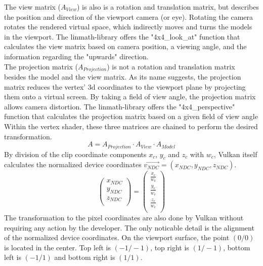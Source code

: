 The view matrix ($A_{View}$) is also is a rotation and translation matrix, but describes the position and direction of the viewport camera (or eye). Rotating the camera rotates the rendered virtual space, which indirectly moves and turns the models in the viewport. The linmath-library offers the "4x4\_look\_at" function that calculates the view matrix based on camera position, a viewing angle, and the information regarding the "upwards" direction.\\
The projection matrix ($A_{Projection}$)  is not a rotation and translation matrix besides the model and the view matrix. As its name suggests, the projection matrix reduces the vertex' 3d coordinates to the viewport plane by projecting them onto a virtual screen. By taking a field of view angle, the projection matrix allows camera distortion. The linmath-library offers the "4x4\_perspective" function that calculates the projection matrix based on a given field of view angle 
Within the vertex shader, these three matrices are chained to perform the desired transformation.
\begin{equation*}  
    A = A_{Projection} \cdot A_{View} \cdot A_{Model}
\end{equation*}
By division of the clip coordinate components $x_{c}$, $y_{c}$ and $z_{c}$ with $w_{c}$, Vulkan itself calculates the normalized device coordinates $\overrightarrow{v_{NDC}} = (x_{NDC}, y_{NDC}, z_{NDC})$.
\begin{equation*}
    \begin{pmatrix}
    x_{NDC}  \\
    y_{NDC}  \\
    z_{NDC}  \\
    \end{pmatrix} 
    =
    \begin{pmatrix}
        \frac{x_{c}}{w_{c}}  \\
        \frac{y_{c}}{w_{c}}  \\
        \frac{z_{c}}{w_{c}}  \\        
        \end{pmatrix}     
\end{equation*}
The transformation to the pixel coordinates are also done by Vulkan without requiring any action by the developer. The only noticable detail is the alignment of the normalized device coordinates. On the viewport surface, the point $(0 / 0)$ is located in the center. Top left is $(-1 / -1)$, top right is $(1 / -1)$, bottom left is $(-1 / 1)$ and bottom right is $(1 / 1)$.

